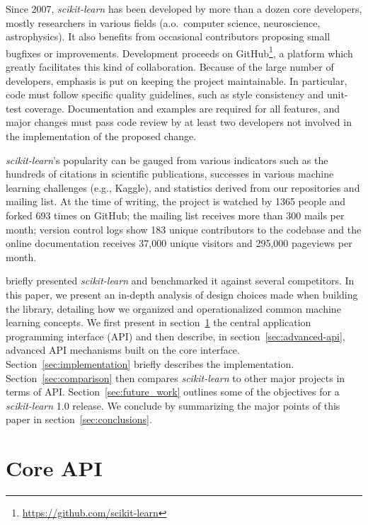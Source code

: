 \documentclass[twocolumn]{article}
\newcommand{\sklearn}{\textit{scikit-learn}\xspace}
\begin{document}
Since 2007, \sklearn has been developed by more than a dozen
core developers, mostly researchers in various fields
(a.o.\ computer science, neuroscience, astrophysics). It also benefits
from occasional contributors proposing small bugfixes or
improvements. Development proceeds on GitHub\footnote{\url{https://github.com/scikit-learn}},
a platform which greatly facilitates this kind of
collaboration. Because of the large number of developers, emphasis is
put on keeping the project maintainable. In particular, code must follow
specific quality guidelines, such as style consistency and unit-test coverage.
Documentation and examples are required for all features,
and major changes must pass code review by at least two
developers not involved in the implementation of the proposed change.

\sklearn's popularity can be gauged from various indicators such as the hundreds
of citations in scientific publications, successes in various machine learning
challenges (e.g., Kaggle), and statistics derived from our
repositories and mailing list.  At the time of writing, the project is watched
by 1365 people and forked 693 times on GitHub; the mailing list receives more
than 300 mails per month; version control logs
show 183 unique contributors to the codebase and the online documentation
receives 37,000 unique visitors and 295,000 pageviews per month.

\citet{pedregosa2011} briefly presented \sklearn and
benchmarked it against several competitors.
In this paper, we present an
in-depth analysis of design choices made when building the library,
detailing how we organized and operationalized
common machine learning concepts.
We first present in section~\ref{sec:core-api} the central application
programming interface (API) and then describe, in section~\ref{sec:advanced-api},
advanced API mechanisms built on the core interface.
Section~\ref{sec:implementation} briefly describes the implementation.
Section~\ref{sec:comparison} then
compares \sklearn to other major projects in terms of API\@.
Section~\ref{sec:future_work} outlines some of the objectives for
a \sklearn 1.0 release.
We conclude by summarizing the major points of this paper in
section~\ref{sec:conclusions}.

\section{Core API}

\label{sec:core-api}
\end{document}
